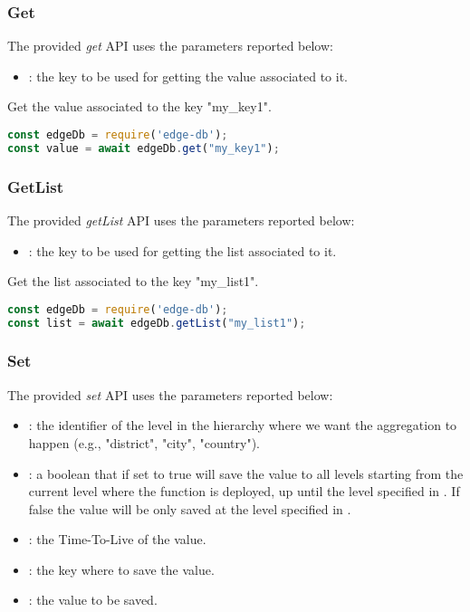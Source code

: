 \subsubsection{Get}
The provided \textit{get} API uses the parameters reported below:

\begin{itemize}
    \item {}: the key to be used for getting the value associated to it.
\end{itemize}

\begin{example}
Get the value associated to the key "my\_key1".
\begin{lstlisting}[language=javascript]
const edgeDb = require('edge-db');
const value = await edgeDb.get("my_key1");
\end{lstlisting}
\end{example}


\subsubsection{GetList}
The provided \textit{getList} API uses the parameters reported below:

\begin{itemize}
    \item {}: the key to be used for getting the list associated to it.
\end{itemize}

\begin{example}
Get the list associated to the key "my\_list1".
\begin{lstlisting}[language=javascript]
const edgeDb = require('edge-db');
const list = await edgeDb.getList("my_list1");
\end{lstlisting}
\end{example}


\subsubsection{Set}
The provided \textit{set} API uses the parameters reported below:

\begin{itemize}
    \item {}: the identifier of the level in the hierarchy where we want the aggregation to happen (e.g., "district", "city", "country").
    \item {}: a boolean that if set to true will save the value to all levels starting from the current level where the function is deployed, up until the level specified in . If false the value will be only saved at the level specified in .
    \item {}: the Time-To-Live of the value.
    \item {}: the key where to save the value.
    \item {}: the value to be saved.
\end{itemize}


